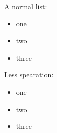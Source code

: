 \documentclass[varwidth=true, border=2pt]{standalone}
\begin{document}
    A normal list:
    \begin{itemize}
        \item one
        \item two
        \item three
    \end{itemize}

    Less spearation:
    \begin{itemize}[noitemsep]
        \item one
        \item two
        \item three
    \end{itemize}
\end{document}
